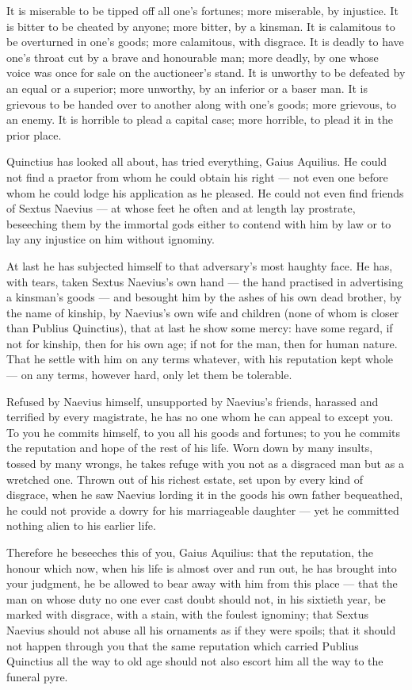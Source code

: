  It is miserable to be tipped off all one's fortunes; more miserable, by injustice. It is bitter to be cheated by anyone; more bitter, by a kinsman. It is calamitous to be overturned in one's goods; more calamitous, with disgrace. It is deadly to have one's throat cut by a brave and honourable man; more deadly, by one whose voice was once for sale on the auctioneer's stand. It is unworthy to be defeated by an equal or a superior; more unworthy, by an inferior or a baser man. It is grievous to be handed over to another along with one's goods; more grievous, to an enemy. It is horrible to plead a capital case; more horrible, to plead it in the prior place.

 Quinctius has looked all about, has tried everything, Gaius Aquilius. He could not find a praetor from whom he could obtain his right --- not even one before whom he could lodge his application as he pleased. He could not even find friends of Sextus Naevius --- at whose feet he often and at length lay prostrate, beseeching them by the immortal gods either to contend with him by law or to lay any injustice on him without ignominy.

 At last he has subjected himself to that adversary's most haughty face. He has, with tears, taken Sextus Naevius's own hand --- the hand practised in advertising a kinsman's goods --- and besought him by the ashes of his own dead brother, by the name of kinship, by Naevius's own wife and children (none of whom is closer than Publius Quinctius), that at last he show some mercy: have some regard, if not for kinship, then for his own age; if not for the man, then for human nature. That he settle with him on any terms whatever, with his reputation kept whole --- on any terms, however hard, only let them be tolerable.

 Refused by Naevius himself, unsupported by Naevius's friends, harassed and terrified by every magistrate, he has no one whom he can appeal to except you. To you he commits himself, to you all his goods and fortunes; to you he commits the reputation and hope of the rest of his life. Worn down by many insults, tossed by many wrongs, he takes refuge with you not as a disgraced man but as a wretched one. Thrown out of his richest estate, set upon by every kind of disgrace, when he saw Naevius lording it in the goods his own father bequeathed, he could not provide a dowry for his marriageable daughter --- yet he committed nothing alien to his earlier life.

 Therefore he beseeches this of you, Gaius Aquilius: that the reputation, the honour which now, when his life is almost over and run out, he has brought into your judgment, he be allowed to bear away with him from this place --- that the man on whose duty no one ever cast doubt should not, in his sixtieth year, be marked with disgrace, with a stain, with the foulest ignominy; that Sextus Naevius should not abuse all his ornaments as if they were spoils; that it should not happen through you that the same reputation which carried Publius Quinctius all the way to old age should not also escort him all the way to the funeral pyre.

